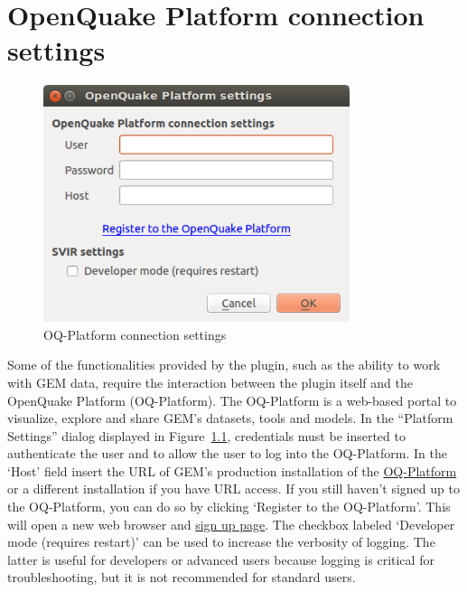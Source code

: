 \chapter{OpenQuake Platform connection settings}

\begin{figure}
    \centering
    \includegraphics[width=0.8\textwidth]{../images/image07}
    \caption{OQ-Platform connection settings}
    \label{fig:connection_settings}
\end{figure}

Some of the functionalities provided by the plugin, such as the ability to work
with GEM data, require the interaction between the plugin itself and the
OpenQuake Platform (OQ-Platform). The OQ-Platform is a web-based portal to
visualize, explore and share GEM's datasets, tools and models. In the “Platform
Settings” dialog displayed in Figure~\ref{fig:connection_settings}, credentials
must be inserted to authenticate the user and to allow the user to log into the
OQ-Platform. In the ‘Host' field insert the URL of GEM's production
installation of the \href{https://platform.openquake.org}{OQ-Platform} or a
different installation if you have URL access. If you still haven't signed up
to the OQ-Platform, you can do so by clicking `Register to the OQ-Platform'.
This will open a new web browser and
\href{https://platform.openquake.org/account/signup/}{sign up page}.  The
checkbox labeled `Developer mode (requires restart)' can be used to increase
the verbosity of logging. The latter is useful for developers or advanced users
because logging is critical for troubleshooting, but it is not recommended for
standard users.
